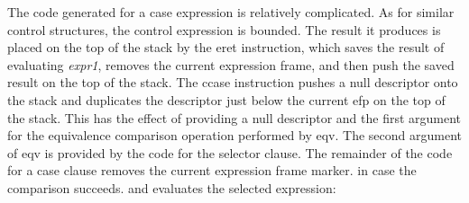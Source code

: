\begin{center}
\tabletail{}
\tablelasttail{}
\begin{supertabular}{|m{1.9073598in}|m{2.75596in}|}

\end{supertabular}
\end{center}

The code generated for a case expression is relatively complicated. As
for similar control structures, the control expression is bounded. The
result it produces is placed on the top of the stack by the eret
instruction, which saves the result of evaluating \textit{expr1},
removes the current expression frame, and then push the saved result
on the top of the stack. The ccase instruction pushes a null
descriptor onto the stack and duplicates the descriptor just below the
current efp on the top of the stack. This has the effect of providing
a null descriptor and the first argument for the equivalence
comparison operation performed by eqv. The second argument of eqv is
provided by the code for the selector clause. The remainder of the
code for a case clause removes the current expression frame marker. in
case the comparison succeeds. and evaluates the selected expression:


